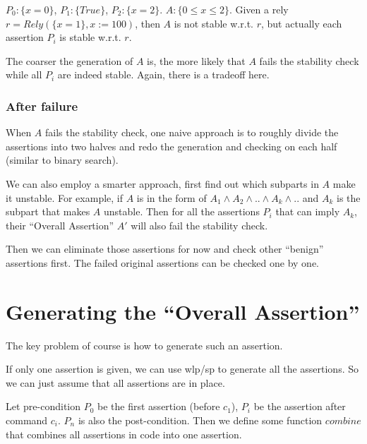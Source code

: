 \documentclass[fleqn]{article}
\begin{document}
$P_0: \{ x = 0 \}$, $P_1: \{ True \}$, $P_2: \{ x = 2 \}$. $A: \{ 0
\le x \le 2 \}$. Given a rely $r = Rely(\{ x = 1 \}, x := 100)$, then
$A$ is not stable w.r.t. $r$, but actually each assertion $P_i$ is
stable w.r.t. $r$.

The coarser the generation of $A$ is, the more likely that $A$ fails
the stability check while all $P_i$ are indeed stable. Again, there is
a tradeoff here.


\subsubsection{After failure}

When $A$ fails the stability check, one naive approach is to roughly
divide the assertions into two halves and redo the generation and
checking on each half (similar to binary search).

We can also employ a smarter approach, first find out which subparts
in $A$ make it unstable. For example, if $A$ is in the form of $A_1
\land A_2 \land .. \land A_k \land ..$ and $A_k$ is the subpart that
makes $A$ unstable. Then for all the assertions $P_i$ that can imply
$A_k$, their ``Overall Assertion'' $A'$ will also fail the stability
check.

Then we can eliminate those assertions for now and check other
``benign'' assertions first. The failed original assertions can be
checked one by one.


\section{Generating the ``Overall Assertion''}

The key problem of course is how to generate such an assertion.

\bigskip


If only one assertion is given, we can use wlp/sp to generate all the
assertions. So we can just assume that all assertions are in place.

Let pre-condition $P_0$ be the first assertion (before $c_1$), $P_i$
be the assertion after command $c_i$. $P_n$ is also the
post-condition. Then we define some function $combine$ that combines
all assertions in code into one assertion.
\end{document}
